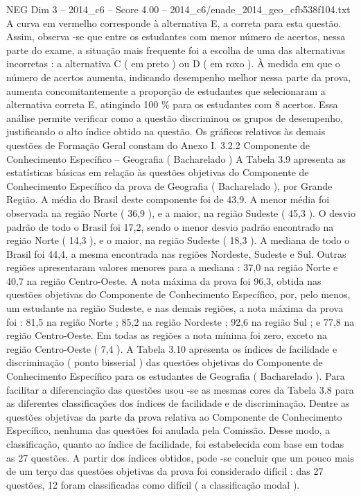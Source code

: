 \begin{textsample}{NEG Dim 3 – 2014\_c6 – Score 4.00 – 2014\_c6/enade\_2014\_geo\_cfb538f104.txt}
A curva em vermelho corresponde à alternativa E, a correta para esta questão.
Assim, observa -se que entre os estudantes com menor número de acertos, nessa parte do exame, a situação mais frequente foi a escolha de uma das alternativas incorretas : a alternativa C ( em preto ) ou D ( em roxo ).
À medida em que o número de acertos aumenta, indicando desempenho melhor nessa parte da prova, aumenta concomitantemente a proporção de estudantes que selecionaram a alternativa correta E, atingindo 100 \% para os estudantes com 8 acertos.
Essa análise permite verificar como a questão discriminou os grupos de desempenho, justificando o alto índice obtido na questão.
Os gráficos relativos às demais questões de Formação Geral constam do Anexo I. 3.2.2 Componente de Conhecimento Específico – Geografia ( Bacharelado ) A Tabela 3.9 apresenta as estatísticas básicas em relação às questões objetivas do Componente de Conhecimento Específico da prova de Geografia ( Bacharelado ), por Grande Região.
A média do Brasil deste componente foi de 43,9.
A menor média foi observada na região Norte ( 36,9 ), e a maior, na região Sudeste ( 45,3 ).
O desvio padrão de todo o Brasil foi 17,2, sendo o menor desvio padrão encontrado na região Norte ( 14,3 ), e o maior, na região Sudeste ( 18,3 ).
A mediana de todo o Brasil foi 44,4, a mesma encontrada nas regiões Nordeste, Sudeste e Sul.
Outras regiões apresentaram valores menores para a mediana : 37,0 na região Norte e 40,7 na região Centro-Oeste.
A nota máxima da prova foi 96,3, obtida nas questões objetivas do Componente de Conhecimento Específico, por, pelo menos, um estudante na região Sudeste, e nas demais regiões, a nota máxima da prova foi : 81,5 na região Norte ; 85,2 na região Nordeste ; 92,6 na região Sul ; e 77,8 na região Centro-Oeste.
Em todas as regiões a nota mínima foi zero, exceto na região Centro-Oeste ( 7,4 ).
A Tabela 3.10 apresenta os índices de facilidade e discriminação ( ponto bisserial ) das questões objetivas do Componente de Conhecimento Específico para os estudantes de Geografia ( Bacharelado ).
Para facilitar a diferenciação das questões usou -se as mesmas cores da Tabela 3.8 para as diferentes classificações dos índices de facilidade e de discriminação.
Dentre as questões objetivas da parte da prova relativa ao Componente de Conhecimento Específico, nenhuma das questões foi anulada pela Comissão.
Desse modo, a classificação, quanto ao índice de facilidade, foi estabelecida com base em todas as 27 questões.
A partir dos índices obtidos, pode -se concluir que um pouco mais de um terço das questões objetivas da prova foi considerado difícil : das 27 questões, 12 foram classificadas como difícil ( a classificação modal ).

\end{textsample}
